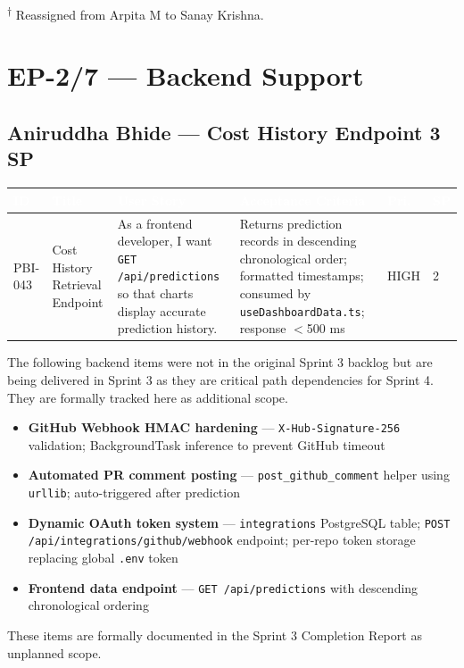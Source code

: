 \documentclass[10pt,a4paper]{article}
\begin{document}
\vspace{0.5em}
{\small \textsuperscript{$\dagger$} Reassigned from Arpita M to Sanay Krishna.}

\vspace{1em}

\section{EP-2/7 — Backend Support}

\subsection*{Aniruddha Bhide — Cost History Endpoint \hfill 3 SP}

\renewcommand{\arraystretch}{1.45}
\begin{tabularx}{\textwidth}{|L{1.4cm}|L{3.2cm}|X|L{3cm}|L{1cm}|L{0.6cm}|}
\hline
{}
\textcolor{white}{\textbf{ID}} &
\textcolor{white}{\textbf{Title}} &
\textcolor{white}{\textbf{User Story}} &
\textcolor{white}{\textbf{Acceptance Criteria}} &
\textcolor{white}{\textbf{Pri.}} &
\textcolor{white}{\textbf{SP}} \\ \hline

PBI-043 &
Cost History Retrieval Endpoint &
As a frontend developer, I want \texttt{GET /api/predictions} so that charts display accurate prediction history. &
Returns prediction records in descending chronological order; formatted timestamps; consumed by \texttt{useDashboardData.ts}; response $<$500 ms &
HIGH & 2 \\ \hline

\end{tabularx}

\vspace{0.6em}
\begin{warnbox}
The following backend items were not in the original Sprint 3 backlog but are being delivered in Sprint 3 as they are critical path dependencies for Sprint 4. They are formally tracked here as additional scope.
\begin{itemize}[leftmargin=1.5em, itemsep=2pt]
  \item \textbf{GitHub Webhook HMAC hardening} — \texttt{X-Hub-Signature-256} validation; BackgroundTask inference to prevent GitHub timeout
  \item \textbf{Automated PR comment posting} — \texttt{post\_github\_comment} helper using \texttt{urllib}; auto-triggered after prediction
  \item \textbf{Dynamic OAuth token system} — \texttt{integrations} PostgreSQL table; \texttt{POST /api/integrations/github/webhook} endpoint; per-repo token storage replacing global \texttt{.env} token
  \item \textbf{Frontend data endpoint} — \texttt{GET /api/predictions} with descending chronological ordering
\end{itemize}
These items are formally documented in the Sprint 3 Completion Report as unplanned scope.
\end{warnbox}
\end{document}
